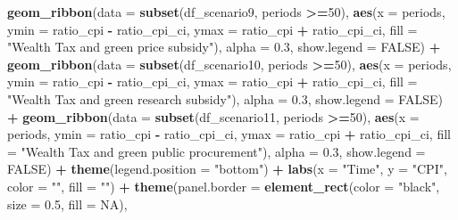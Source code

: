\documentclass[
]{article}
\newenvironment{Shaded}{\begin{snugshade}}{\end{snugshade}}
\newcommand{\AttributeTok}[1]{\textcolor[rgb]{0.13,0.29,0.53}{#1}}
\newcommand{\ConstantTok}[1]{\textcolor[rgb]{0.56,0.35,0.01}{#1}}
\newcommand{\DecValTok}[1]{\textcolor[rgb]{0.00,0.00,0.81}{#1}}
\newcommand{\FloatTok}[1]{\textcolor[rgb]{0.00,0.00,0.81}{#1}}
\newcommand{\FunctionTok}[1]{\textcolor[rgb]{0.13,0.29,0.53}{\textbf{#1}}}
\newcommand{\NormalTok}[1]{#1}
\newcommand{\SpecialCharTok}[1]{\textcolor[rgb]{0.81,0.36,0.00}{\textbf{#1}}}
\newcommand{\StringTok}[1]{\textcolor[rgb]{0.31,0.60,0.02}{#1}}
\begin{document}
\begin{Shaded}
\begin{Highlighting}[]
  \FunctionTok{geom\_ribbon}\NormalTok{(}\AttributeTok{data =} \FunctionTok{subset}\NormalTok{(df\_scenario9, periods }\SpecialCharTok{\textgreater{}=}\DecValTok{50}\NormalTok{), }\FunctionTok{aes}\NormalTok{(}\AttributeTok{x =}\NormalTok{ periods, }\AttributeTok{ymin =}\NormalTok{ ratio\_cpi }\SpecialCharTok{{-}}\NormalTok{ ratio\_cpi\_ci, }\AttributeTok{ymax =}\NormalTok{ ratio\_cpi }\SpecialCharTok{+}\NormalTok{ ratio\_cpi\_ci, }\AttributeTok{fill =} \StringTok{"Wealth Tax and green price subsidy"}\NormalTok{), }\AttributeTok{alpha =} \FloatTok{0.3}\NormalTok{, }\AttributeTok{show.legend =} \ConstantTok{FALSE}\NormalTok{) }\SpecialCharTok{+}
  \FunctionTok{geom\_ribbon}\NormalTok{(}\AttributeTok{data =} \FunctionTok{subset}\NormalTok{(df\_scenario10, periods }\SpecialCharTok{\textgreater{}=}\DecValTok{50}\NormalTok{), }\FunctionTok{aes}\NormalTok{(}\AttributeTok{x =}\NormalTok{ periods, }\AttributeTok{ymin =}\NormalTok{ ratio\_cpi }\SpecialCharTok{{-}}\NormalTok{ ratio\_cpi\_ci, }\AttributeTok{ymax =}\NormalTok{ ratio\_cpi }\SpecialCharTok{+}\NormalTok{ ratio\_cpi\_ci, }\AttributeTok{fill =} \StringTok{"Wealth Tax and green research subsidy"}\NormalTok{), }\AttributeTok{alpha =} \FloatTok{0.3}\NormalTok{, }\AttributeTok{show.legend =} \ConstantTok{FALSE}\NormalTok{) }\SpecialCharTok{+}
  \FunctionTok{geom\_ribbon}\NormalTok{(}\AttributeTok{data =} \FunctionTok{subset}\NormalTok{(df\_scenario11, periods }\SpecialCharTok{\textgreater{}=}\DecValTok{50}\NormalTok{), }\FunctionTok{aes}\NormalTok{(}\AttributeTok{x =}\NormalTok{ periods, }\AttributeTok{ymin =}\NormalTok{ ratio\_cpi }\SpecialCharTok{{-}}\NormalTok{ ratio\_cpi\_ci, }\AttributeTok{ymax =}\NormalTok{ ratio\_cpi }\SpecialCharTok{+}\NormalTok{ ratio\_cpi\_ci, }\AttributeTok{fill =} \StringTok{"Wealth Tax and green public procurement"}\NormalTok{), }\AttributeTok{alpha =} \FloatTok{0.3}\NormalTok{, }\AttributeTok{show.legend =} \ConstantTok{FALSE}\NormalTok{) }\SpecialCharTok{+}
  \FunctionTok{theme}\NormalTok{(}\AttributeTok{legend.position =} \StringTok{"bottom"}\NormalTok{) }\SpecialCharTok{+}
  \FunctionTok{labs}\NormalTok{(}\AttributeTok{x =} \StringTok{"Time"}\NormalTok{, }\AttributeTok{y =} \StringTok{"CPI"}\NormalTok{, }\AttributeTok{color =} \StringTok{""}\NormalTok{, }\AttributeTok{fill =} \StringTok{""}\NormalTok{) }\SpecialCharTok{+}
  \FunctionTok{theme}\NormalTok{(}\AttributeTok{panel.border =} \FunctionTok{element\_rect}\NormalTok{(}\AttributeTok{color =} \StringTok{"black"}\NormalTok{, }\AttributeTok{size =} \FloatTok{0.5}\NormalTok{, }\AttributeTok{fill =} \ConstantTok{NA}\NormalTok{),}

\end{Highlighting}
\end{Shaded}
\end{document}
